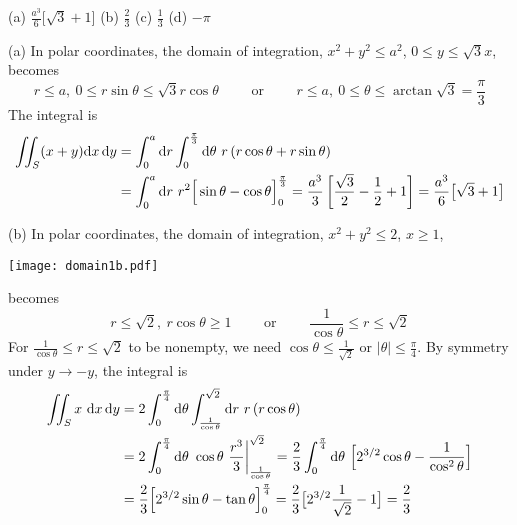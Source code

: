 \begin{answer}
(a) $\frac{a^3}{6}\big[\sqrt{3}+1\big]$\qquad
(b) $\frac{2}{3}$  \qquad
(c) $\frac{1}{3}$ \qquad
(d) $-\pi$
\end{answer}

\begin{solution}
(a) In polar coordinates, the domain of integration,
$x^2+y^2\le a^2$, $0\le y\le \sqrt{3}x$, becomes 
\begin{equation*}
r\le a,\ 0\le r\sin\theta\le\sqrt{3}r\cos\theta\qquad\text{ or }\qquad
r\le a,\ 0\le\theta\le \arctan\sqrt{3}=\frac{\pi}{3}
\end{equation*}
The integral is 
\begin{align*}
\dblInt_S (x+y)\dee{x}\,\dee{y}
&=\int_0^a \dee{r}\int_0^{{\pi\over 3}}\dee{\theta}\ r\,(r\cos\theta+r\sin\theta)\\
&=\int_0^a \dee{r}\ r^2\Big[\sin\theta-\cos\theta\Big]_0^{{\pi\over 3}}
=\frac{a^3}{3}\left[\frac{\sqrt{3}}{2}-\frac{1}{2}+1\right]
=\frac{a^3}{6}\big[\sqrt{3}+1\big]
\end{align*}

(b) 
In polar coordinates, the domain of integration,
$x^2+y^2\le 2$, $x\ge 1$, 

\begin{center}
     \texttt{[image: domain1b.pdf]}
\end{center}

becomes 
\begin{equation*}
r\le \sqrt{2},\ r\cos\theta\ge 1\qquad\text{ or }\qquad
  \frac{1}{\cos\theta}\le r\le\sqrt{2}
\end{equation*}
For $\frac{1}{\cos\theta}\le r\le\sqrt{2}$ to be nonempty, we need
$\cos\theta\le \frac{1}{\sqrt{2}}$ or $|\theta|\le\frac{\pi}{4}$.
By symmetry under $y\rightarrow -y$, the integral is 
\begin{align*}
\dblInt_Sx\ \dee{x}\,\dee{y}
&=2\int_0^{{\pi\over 4}}\dee{\theta}\int_{1\over\cos\theta}^{\sqrt{2}} 
\dee{r}\ r\,(r\cos\theta)\\
&=2\int_0^{{\pi\over 4}}\dee{\theta}\ \cos\theta\ 
\frac{r^3}{3}\bigg|_{1\over\cos\theta}^{\sqrt{2}} 
=\frac{2}{3}\int_0^{{\pi\over 4}}\dee{\theta}\ 
\Big[2^{3/2}\cos\theta-\frac{1}{\cos^2\theta}\Big] \\
&=\frac{2}{3} \Big[2^{3/2}\sin\theta-\tan\theta\Big]_0^{{\pi\over 4}}
=\frac{2}{3} \big[2^{3/2}\frac{1}{\sqrt{2}}-1\big]
=\frac{2}{3}
\end{align*}


\end{solution}
